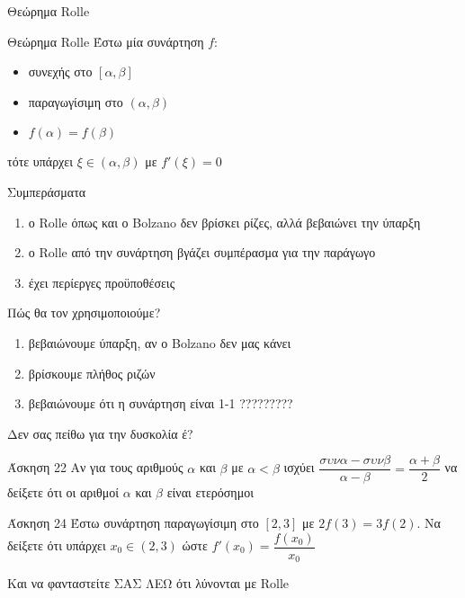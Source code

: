 \documentclass{presentation}
\begin{document}
\begin{frame}{Θεώρημα Rolle}
    \begin{block}{Θεώρημα Rolle}
        Έστω μία συνάρτηση $f$:
        \begin{itemize}
            \item συνεχής στο $[α,β]$
            \item παραγωγίσιμη στο $(α,β)$
            \item $f(α)=f(β)$
        \end{itemize}
        τότε υπάρχει $ξ\in (α,β)$ με $f'(ξ)=0$
    \end{block}
\end{frame}

\begin{frame}{Συμπεράσματα}
    \begin{enumerate}
        \item<1-> ο Rolle όπως και ο Bolzano δεν βρίσκει ρίζες, αλλά βεβαιώνει την ύπαρξη
        \item<2-> ο Rolle από την συνάρτηση βγάζει συμπέρασμα για την παράγωγο
        \item<3-> έχει περίεργες προϋποθέσεις
    \end{enumerate}
\end{frame}

\begin{frame}{Πώς θα τον χρησιμοποιούμε?}
    \begin{enumerate}
        \item<1-> βεβαιώνουμε ύπαρξη, αν ο Bolzano δεν μας κάνει
        \item<2-> βρίσκουμε πλήθος ριζών
        \item<3-> βεβαιώνουμε ότι η συνάρτηση είναι 1-1 ?????????
    \end{enumerate}
\end{frame}

\begin{frame}{Δεν σας πείθω για την δυσκολία έ?}
    \begin{block}{Άσκηση 22}
        Αν για τους αριθμούς $α$ και $β$ με $α<β$ ισχύει $\dfrac{συνα-συνβ}{α-β}=\dfrac{α+β}{2}$ να δείξετε ότι οι αριθμοί $α$ και $β$ είναι ετερόσημοι
    \end{block}
    \begin{block}{Άσκηση 24}
        Έστω συνάρτηση παραγωγίσιμη στο $[2,3]$ με $2f(3)=3f(2)$. Να δείξετε ότι υπάρχει $x_0\in (2,3)$ ώστε $f'(x_0)=\dfrac{f(x_0)}{x_0}$
    \end{block}
     Και να φανταστείτε ΣΑΣ ΛΕΩ ότι λύνονται με Rolle
\end{frame}
\end{document}
